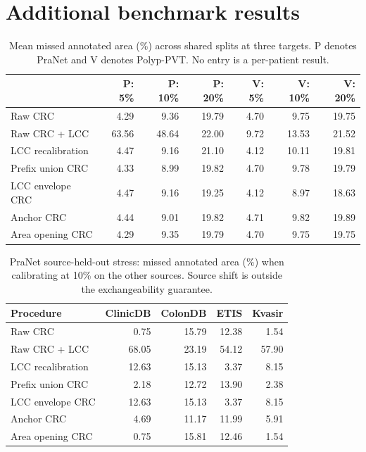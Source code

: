 \section{Additional benchmark results}\label{app:additional}
\begin{table}[htbp]\centering\small
\caption{Mean missed annotated area (\%) across shared splits at three targets. P denotes PraNet and V denotes Polyp-PVT. No entry is a per-patient result.}
\begin{tabular}{lrrrrrr}\toprule
 & P: 5\% & P: 10\% & P: 20\% & V: 5\% & V: 10\% & V: 20\%\\\midrule
Raw CRC & 4.29 & 9.36 & 19.79 & 4.70 & 9.75 & 19.75 \\
Raw CRC + LCC & 63.56 & 48.64 & 22.00 & 9.72 & 13.53 & 21.52 \\
LCC recalibration & 4.47 & 9.16 & 21.10 & 4.12 & 10.11 & 19.81 \\
Prefix union CRC & 4.33 & 8.99 & 19.82 & 4.70 & 9.78 & 19.79 \\
LCC envelope CRC & 4.47 & 9.16 & 19.25 & 4.12 & 8.97 & 18.63 \\
Anchor CRC & 4.44 & 9.01 & 19.82 & 4.71 & 9.82 & 19.89 \\
Area opening CRC & 4.29 & 9.35 & 19.79 & 4.70 & 9.75 & 19.75 \\
\bottomrule\end{tabular}\end{table}
\begin{table}[htbp]\centering\small\caption{PraNet source-held-out stress: missed annotated area (\%) when calibrating at 10\% on the other sources. Source shift is outside the exchangeability guarantee.}
\begin{tabular}{lrrrr}\toprule
Procedure & ClinicDB & ColonDB & ETIS & Kvasir\\\midrule
Raw CRC & 0.75 & 15.79 & 12.38 & 1.54 \\
Raw CRC + LCC & 68.05 & 23.19 & 54.12 & 57.90 \\
LCC recalibration & 12.63 & 15.13 & 3.37 & 8.15 \\
Prefix union CRC & 2.18 & 12.72 & 13.90 & 2.38 \\
LCC envelope CRC & 12.63 & 15.13 & 3.37 & 8.15 \\
Anchor CRC & 4.69 & 11.17 & 11.99 & 5.91 \\
Area opening CRC & 0.75 & 15.81 & 12.46 & 1.54 \\
\bottomrule\end{tabular}\end{table}
